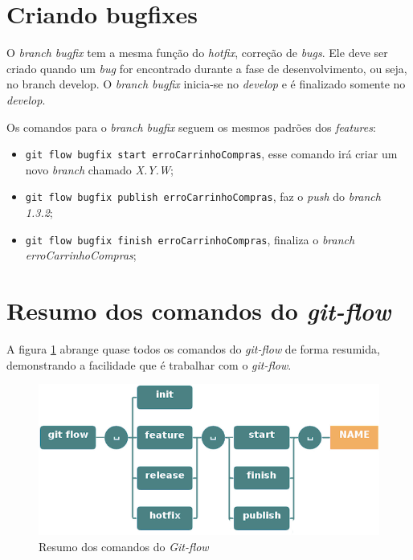 \documentclass[12pt,openright,oneside,a4paper,english,brazil]{abntex2}
\begin{document}
\section{Criando bugfixes}

O \textit{branch bugfix} tem a mesma função do \textit{hotfix}, correção de \textit{bugs}. Ele deve ser criado quando um \textit{bug} for encontrado durante a fase de desenvolvimento, ou seja, no branch develop. O \textit{branch bugfix} inicia-se no \textit{develop} e é finalizado somente no \textit{develop}.

Os comandos para o \textit{branch bugfix} seguem os mesmos padrões dos \textit{features}:

\begin{itemize}
	\item \verb|git flow bugfix start erroCarrinhoCompras|, esse comando irá criar um novo \textit{branch} chamado \textit{X.Y.W};
	\item \verb|git flow bugfix publish erroCarrinhoCompras|, faz o \textit{push} do \textit{branch 1.3.2};
	\item \verb|git flow bugfix finish erroCarrinhoCompras|, finaliza o \textit{branch erroCarrinhoCompras};
\end{itemize}

\section{Resumo dos comandos do \textit{git-flow}}

A figura \ref{comandos} abrange quase todos os comandos do \textit{git-flow} de forma resumida, demonstrando a facilidade que é trabalhar com o \textit{git-flow}.

\begin{figure}[htb]
	\caption{\label{comandos}Resumo dos comandos do \textit{Git-flow}}
	\begin{center}
		\includegraphics[width=1\linewidth]{comandos}
	\end{center}
\end{figure}
\end{document}
